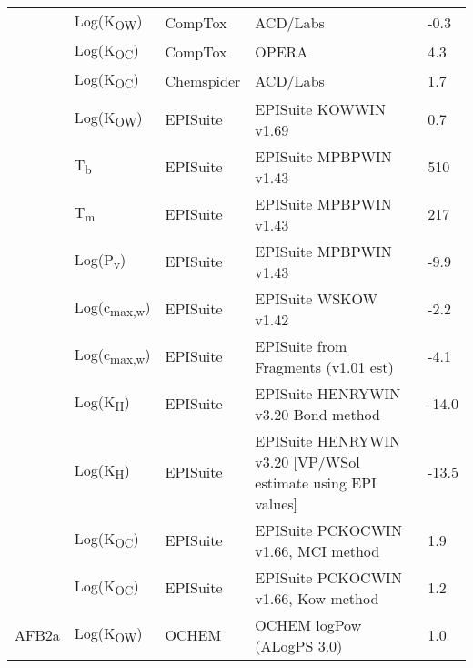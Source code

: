 \begin{landscape}
\begin{longtable}[c]{lllll}
          & Log(K\textsubscript{OW})      & CompTox    & ACD/Labs                                                                        & -0.3  \\
          & Log(K\textsubscript{OC})      & CompTox    & OPERA                                                                           & 4.3   \\
          & Log(K\textsubscript{OC})      & Chemspider & ACD/Labs                                                                        & 1.7   \\
          & Log(K\textsubscript{OW})      & EPISuite   & EPISuite KOWWIN v1.69                                                           & 0.7   \\
          & T\textsubscript{b}          & EPISuite   & EPISuite MPBPWIN v1.43                                                          & 510   \\
          & T\textsubscript{m}          & EPISuite   & EPISuite MPBPWIN v1.43                                                          & 217   \\
          & Log(P\textsubscript{v})       & EPISuite   & EPISuite MPBPWIN v1.43                                                          & -9.9  \\
          & Log(c\textsubscript{max,w}) & EPISuite   & EPISuite WSKOW v1.42                                                            & -2.2  \\
          & Log(c\textsubscript{max,w}) & EPISuite   & EPISuite from Fragments (v1.01 est)                                             & -4.1  \\
          & Log(K\textsubscript{H})       & EPISuite   & EPISuite HENRYWIN v3.20 Bond method                                             & -14.0 \\
          & Log(K\textsubscript{H})       & EPISuite   & EPISuite HENRYWIN v3.20 [VP/WSol estimate using EPI values]                     & -13.5 \\
          & Log(K\textsubscript{OC})      & EPISuite   & EPISuite PCKOCWIN v1.66, MCI method                                             & 1.9   \\
          & Log(K\textsubscript{OC})      & EPISuite   & EPISuite PCKOCWIN v1.66, Kow method                                             & 1.2   \\
          \hline
AFB2a     & Log(K\textsubscript{OW})      & OCHEM      & OCHEM logPow (ALogPS 3.0)                                                       & 1.0   \\

\end{longtable}
\end{landscape}
